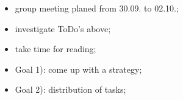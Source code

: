 \documentclass{article}
\begin{document}
\begin{tcolorbox}[title=Plan]
\begin{itemize}
 \item group meeting planed from 30.09. to 02.10.;
 \item investigate ToDo's above;
 \item take time for reading;
 \item Goal 1): come up with a strategy;
 \item Goal 2): distribution of tasks;
\end{itemize}
\end{tcolorbox}
\end{document}
